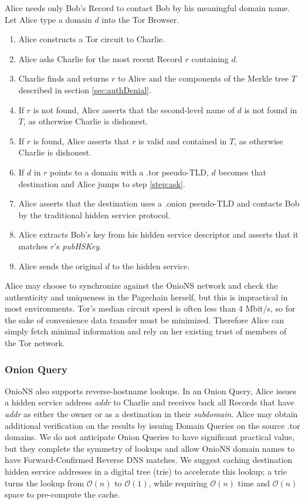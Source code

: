 \documentclass[conference]{IEEEtran}
\begin{document}
Alice needs only Bob's Record to contact Bob by his meaningful domain name. Let Alice type a domain $ d $ into the Tor Browser.

\begin{enumerate}
	\item Alice constructs a Tor circuit to Charlie.
	\item \label{step:ask} Alice asks Charlie for the most recent Record $ r $ containing $ d $.
	\item Charlie finds and returns $ r $ to Alice and the components of the Merkle tree $ T $ described in section \ref{sec:authDenial}.
	\item If $ r $ is not found, Alice asserts that the second-level name of $ d $ is not found in $ T $, as otherwise Charlie is dishonest.
	\item If $ r $ is found, Alice asserts that $ r $ is valid and contained in $ T $, as otherwise Charlie is dishonest.
	\item If $ d $ in $ r $ points to a domain with a .tor pseudo-TLD, $ d $ becomes that destination and Alice jumps to step \ref{step:ask}.
	\item Alice asserts that the destination uses a .onion pseudo-TLD and contacts Bob by the traditional hidden service protocol.
	\item Alice extracts Bob's key from his hidden service descriptor and asserts that it matches $ r $'s \emph{pubHSKey}.
	\item Alice sends the original $ d $ to the hidden service.
\end{enumerate}

Alice may choose to synchronize against the OnioNS network and check the authenticity and uniqueness in the Pagechain herself, but this is impractical in most environments. Tor's median circuit speed is often less than 4 Mbit/s, \cite{TorMetrics} so for the sake of convenience data transfer must be minimized. Therefore Alice can simply fetch minimal information and rely on her existing trust of members of the Tor network.

\subsubsection{Onion Query}

OnioNS also supports reverse-hostname lookups. In an Onion Query, Alice issues a hidden service address \emph{addr} to Charlie and receives back all Records that have \emph{addr} as either the owner or as a destination in their \emph{subdomain}. Alice may obtain additional verification on the results by issuing Domain Queries on the source .tor domains. We do not anticipate Onion Queries to have significant practical value, but they complete the symmetry of lookups and allow OnioNS domain names to have Forward-Confirmed Reverse DNS matches. We suggest caching destination hidden service addresses in a digital tree (trie) to accelerate this lookup; a trie turns the lookup from $ \mathcal{O}(n) $ to $ \mathcal{O}(1) $, while requiring $ \mathcal{O}(n) $ time and $ \mathcal{O}(n) $ space to pre-compute the cache.
\end{document}
